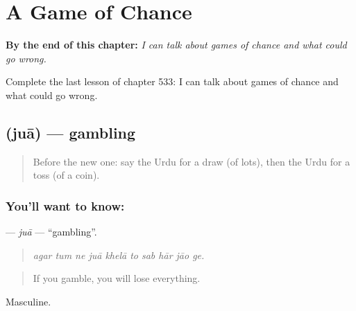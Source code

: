 
\chapter{A Game of Chance}
\label{ch:ur-a-game-of-chance}

\begin{chapteropening}
\textbf{By the end of this chapter:} \emph{I can talk about games of chance and what could go wrong.}

Complete the last lesson of chapter 533: I can talk about games of chance and what could go wrong.
\end{chapteropening}

\section[\texorpdfstring{\ur{جوا} (juā)}{جوا (juā)}]{ (juā) — gambling}

\label{lesson:UR-C533-jua}



\begin{quote}
Before the new one: say the Urdu for a draw (of lots), then the Urdu for a toss (of a coin).
\end{quote}

\subsection*{You'll want to know: }
\textbf{} — \emph{juā} — \textquotedblleft{}gambling\textquotedblright{}.

\begin{quote}
         
\end{quote}

\begin{quote}
\emph{agar tum ne juā khelā to sab hār jāo ge.}
\end{quote}

\begin{quote}
If you gamble, you will lose everything.
\end{quote}

Masculine.

